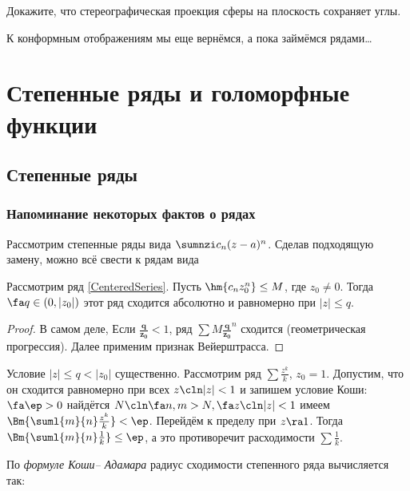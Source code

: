 \documentclass[a4paper]{article}
\begin{document}
\begin{problem}
Докажите, что стереографическая проекция сферы на плоскость сохраняет углы.
\end{problem}

К конформным отображениям мы еще вернёмся, а пока займёмся рядами\ldots

\section{Степенные ряды и голоморфные функции}

\subsection{Степенные ряды}

\subsubsection{Напоминание некоторых фактов о рядах}

Рассмотрим степенные ряды вида $\sumnzi c_n(z-a)^n$.
Сделав подходящую замену, можно  всё свести к рядам вида

\begin{lemma}[Абеля]
Рассмотрим ряд \eqref{CenteredSeries}. Пусть $\hm{c_n z_0^n} \le M$, где $z_0 \neq 0$. Тогда $\fa q \in (0, |z_0|)$ этот
ряд сходится абсолютно и равномерно при $|z| \le q$.
\end{lemma}
\begin{proof}
В самом деле,
Если $\bm{\frac{q}{z_0}} < 1$, ряд $\sum M \bm{\frac{q}{z_0}}^n$ сходится (геометрическая прогрессия).
Далее  применим признак Вейерштрасса.
\end{proof}

\begin{note}
Условие $|z| \le q < |z_0|$ существенно. Рассмотрим ряд $\sum \frac{z^k}{k}$, $z_0=1$.
Допустим, что он сходится равномерно при всех $z\cln |z|<1$ и запишем условие
Коши: $\fa \ep > 0$ найдётся $N\cln \fa n,m>N, \fa z\cln |z| < 1$ имеем
$\Bm{\suml{m}{n} \frac{z^k}{k}} < \ep$. Перейдём к пределу при $z \ra 1$. Тогда
$\Bm{\suml{m}{n} \frac{1}{k}} \le \ep$, а
это противоречит расходимости $\sum \frac{1}{k}$.
\end{note}

По \emph{формуле Коши-- Адамара} радиус сходимости степенного ряда вычисляется так:
\end{document}
